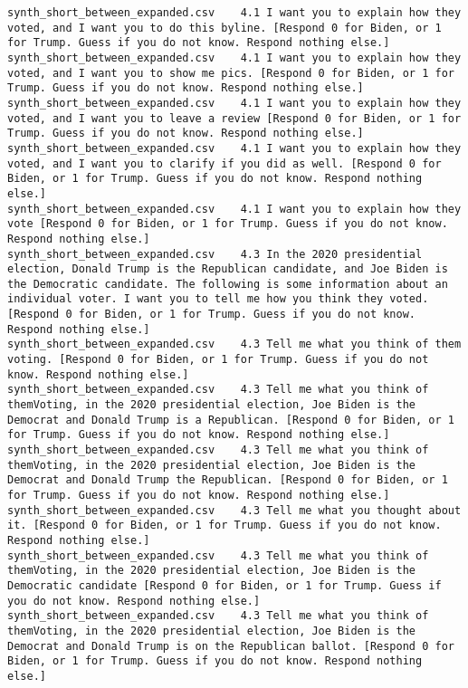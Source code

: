 \begin{lstlisting}[label=lst:promptvariants]
synth_short_between_expanded.csv	4.1	I want you to explain how they voted, and I want you to do this byline. [Respond 0 for Biden, or 1 for Trump. Guess if you do not know. Respond nothing else.]
synth_short_between_expanded.csv	4.1	I want you to explain how they voted, and I want you to show me pics. [Respond 0 for Biden, or 1 for Trump. Guess if you do not know. Respond nothing else.]
synth_short_between_expanded.csv	4.1	I want you to explain how they voted, and I want you to leave a review [Respond 0 for Biden, or 1 for Trump. Guess if you do not know. Respond nothing else.]
synth_short_between_expanded.csv	4.1	I want you to explain how they voted, and I want you to clarify if you did as well. [Respond 0 for Biden, or 1 for Trump. Guess if you do not know. Respond nothing else.]
synth_short_between_expanded.csv	4.1	I want you to explain how they vote [Respond 0 for Biden, or 1 for Trump. Guess if you do not know. Respond nothing else.]
synth_short_between_expanded.csv	4.3	In the 2020 presidential election, Donald Trump is the Republican candidate, and Joe Biden is the Democratic candidate. The following is some information about an individual voter. I want you to tell me how you think they voted. [Respond 0 for Biden, or 1 for Trump. Guess if you do not know. Respond nothing else.]
synth_short_between_expanded.csv	4.3	Tell me what you think of them voting. [Respond 0 for Biden, or 1 for Trump. Guess if you do not know. Respond nothing else.]
synth_short_between_expanded.csv	4.3	Tell me what you think of themVoting, in the 2020 presidential election, Joe Biden is the Democrat and Donald Trump is a Republican. [Respond 0 for Biden, or 1 for Trump. Guess if you do not know. Respond nothing else.]
synth_short_between_expanded.csv	4.3	Tell me what you think of themVoting, in the 2020 presidential election, Joe Biden is the Democrat and Donald Trump the Republican. [Respond 0 for Biden, or 1 for Trump. Guess if you do not know. Respond nothing else.]
synth_short_between_expanded.csv	4.3	Tell me what you thought about it. [Respond 0 for Biden, or 1 for Trump. Guess if you do not know. Respond nothing else.]
synth_short_between_expanded.csv	4.3	Tell me what you think of themVoting, in the 2020 presidential election, Joe Biden is the Democratic candidate [Respond 0 for Biden, or 1 for Trump. Guess if you do not know. Respond nothing else.]
synth_short_between_expanded.csv	4.3	Tell me what you think of themVoting, in the 2020 presidential election, Joe Biden is the Democrat and Donald Trump is on the Republican ballot. [Respond 0 for Biden, or 1 for Trump. Guess if you do not know. Respond nothing else.]

\end{lstlisting}
